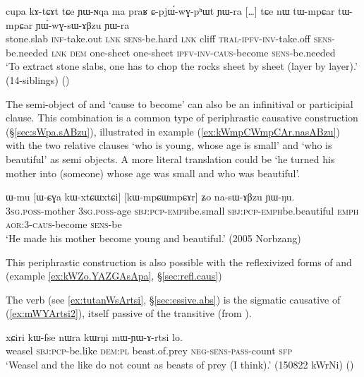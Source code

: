\begin{exe}
\ex \label{ex:tWmpCar.YWwGGsABzu}
\gll cupa kɤ-tɕɤt tɕe ɲɯ-ɴqa ma praʁ ɕ-pjɯ́-wɣ-pʰɯt ɲɯ-ra […]  tɕe nɯ tɯ-mpɕar tɯ-mpɕar ɲɯ́-wɣ-sɯ-ɤβzu ɲɯ-ra \\
stone.slab \textsc{inf}-take.out \textsc{lnk} \textsc{sens}-be.hard \textsc{lnk} cliff \textsc{tral}-\textsc{ipfv}-\textsc{inv}-take.off \textsc{sens}-be.needed { } 
\textsc{lnk} \textsc{dem} one-sheet one-sheet \textsc{ipfv}-\textsc{inv}-\textsc{caus}-become \textsc{sens}-be.needed \\
\glt `To extract stone slabs, one has to chop the rocks sheet by sheet (layer by layer).’ (14-siblings)
()
\end{exe} 

The semi-object of   and  `cause to become' can also be an infinitival or participial clause. This combination is a common type of periphrastic causative construction (§\ref{sec:sWpa.sABzu}), illustrated in example (\ref{ex:kWmpCWmpCAr.nasABzu}) with the two relative clauses  `who is young, whose age is small' and  `who is beautiful' as semi objects. A more literal translation could be `he turned his mother into (someone) whose age was small and who was beautiful'.
 
\begin{exe}
\ex \label{ex:kWmpCWmpCAr.nasABzu}
\gll ɯ-mu [ɯ-ɕɣa kɯ-xtɕɯ\redp{}xtɕi] [kɯ-mpɕɯ\redp{}mpɕɤr] ʑo na-sɯ-ɤβzu ɲɯ-ŋu. \\
\textsc{3sg}.\textsc{poss}-mother \textsc{3sg}.\textsc{poss}-age \textsc{sbj}:\textsc{pcp}-\textsc{emph}\redp{}be.small \textsc{sbj}:\textsc{pcp}-\textsc{emph}\redp{}be.beautiful \textsc{emph} \textsc{aor}:3\flobv{}-\textsc{caus}-become \textsc{sens}-be \\
\glt `He made his mother become young and beautiful.' (2005 Norbzang)
\end{exe} 
 
This periphrastic construction is also possible with the reflexivized forms of  and    (example \ref{ex:kWZo.YAZGAsApa}, §\ref{sec:refl.caus})

The verb   (see \ref{ex:tutanWsArtsi}, §\ref{sec:essive.abs}) is the sigmatic causative of  (\ref{ex:mWYArtsi2}), itself passive of the transitive   (from ).

 \begin{exe}
\ex \label{ex:mWYArtsi2}
\gll xɕiri kɯ-fse nɯra kɯrŋi mɯ-ɲɯ-ɤ-rtsi lo. \\
 weasel \textsc{sbj}:\textsc{pcp}-be.like \textsc{dem}:\textsc{pl}  beast.of.prey \textsc{neg}-\textsc{sens}-\textsc{pass}-count \textsc{sfp} \\
\glt `Weasel and the like do not count as beasts of prey (I think).' (150822 kWrNi) ()
\end{exe} 

